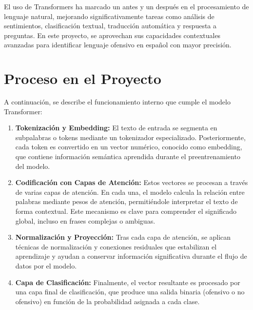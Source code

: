 El uso de Transformers ha marcado un antes y un después en el procesamiento de lenguaje natural, mejorando significativamente tareas como análisis de sentimientos, clasificación textual, traducción automática y respuesta a preguntas. En este proyecto, se aprovechan sus capacidades contextuales avanzadas para identificar lenguaje ofensivo en español con mayor precisión.




\vspace{0.5cm}

\section{Proceso en el Proyecto}

A continuación, se describe el funcionamiento interno que cumple el modelo Transformer:

\begin{enumerate}
    \item \textbf{Tokenización y Embedding:} El texto de entrada se segmenta en subpalabras o tokens mediante un tokenizador especializado. Posteriormente, cada token es convertido en un vector numérico, conocido como embedding, que contiene información semántica aprendida durante el preentrenamiento del modelo.

    \item \textbf{Codificación con Capas de Atención:} Estos vectores se procesan a través de varias capas de atención. En cada una, el modelo calcula la relación entre palabras mediante pesos de atención, permitiéndole interpretar el texto de forma contextual. Este mecanismo es clave para comprender el significado global, incluso en frases complejas o ambiguas.

    \item \textbf{Normalización y Proyección:} Tras cada capa de atención, se aplican técnicas de normalización y conexiones residuales que estabilizan el aprendizaje y ayudan a conservar información significativa durante el flujo de datos por el modelo.

    \item \textbf{Capa de Clasificación:} Finalmente, el vector resultante es procesado por una capa final de clasificación, que produce una salida binaria (ofensivo o no ofensivo) en función de la probabilidad asignada a cada clase.
\end{enumerate}












